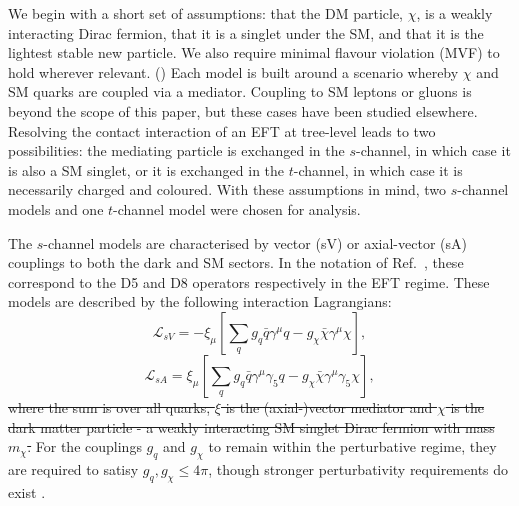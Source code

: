 We begin with a short set of assumptions: that the DM particle, $\chi$, is a weakly interacting Dirac fermion, that it is a singlet under the SM, and that it is the lightest stable new particle. We also require minimal flavour violation (MVF) to hold wherever relevant. () Each model is built around a scenario whereby $\chi$ and SM quarks are coupled via a mediator. Coupling to SM leptons \cite{} or gluons \cite{} is beyond the scope of this paper, but these cases have been studied elsewhere. Resolving the contact interaction of an EFT at tree-level leads to two possibilities: the mediating particle is exchanged in the $s$-channel, in which case it is also a SM singlet, or it is exchanged in the $t$-channel, in which case it is necessarily charged and coloured. With these assumptions in mind, two $s$-channel models and one $t$-channel model were chosen for analysis. 

The $s$-channel models are characterised by vector (sV) or axial-vector (sA) couplings to both the dark and SM sectors. In the notation of Ref.~\cite{DMCons2}, these correspond to the D5 and D8 operators respectively in the EFT regime. These models are described by the following interaction Lagrangians:
\begin{equation}
\label{L_int_sV}
\mathcal{L}_{sV} = - \xi_{\mu}\left[ \sum\limits_{q} g_{q}\bar{q}\gamma^{\mu}q - g_{\chi}\bar{\chi}\gamma^{\mu}\chi\right],
\end{equation}
\begin{equation}
\label{L_int_sA}
\mathcal{L}_{sA} =  \xi_{\mu}\left[\sum\limits_{q} g_{q}\bar{q}\gamma^{\mu}\gamma_{5}q - g_{\chi}\bar{\chi}\gamma^{\mu}\gamma_{5}\chi\right],
\end{equation}
\st{where the sum is over all quarks, $\xi$ is the (axial-)vector mediator and $\chi$ is the dark matter particle - a weakly interacting SM singlet Dirac fermion with mass $m_{\chi}$.}
For the couplings $g_q$ and $g_{\chi}$ to remain within the perturbative regime, they are required to satisy $g_{q},g_{\chi} \leq 4\pi$, though stronger perturbativity requirements do exist \cite{ValidEFT}.

